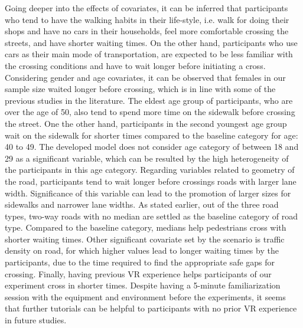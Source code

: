 Going deeper into the effects of covariates, it can be inferred that participants who tend to have the walking habits in their life-style, i.e. walk for doing their shops and have no cars in their households, feel more comfortable crossing the streets, and have shorter waiting times. On the other hand, participants who use cars as their main mode of transportation, are expected to be less familiar with the crossing conditions and have to wait longer before initiating a cross. Considering gender and age covariates, it can be observed that females in our sample size waited longer before crossing, which is in line with some of the previous studies in the literature. The eldest age group of participants, who are over the age of 50, also tend to spend more time on the sidewalk before crossing the street. One the other hand, participants in the second youngest age group wait on the sidewalk for shorter times compared to the baseline category for age: 40 to 49. The developed model does not consider age category of between 18 and 29 as a significant variable, which can be resulted by the high heterogeneity of the participants in this age category.
Regarding variables related to geometry of the road, participants tend to wait longer before crossings roads with larger lane width. Significance of this variable can lead to the promotion of larger sizes for sidewalks and narrower lane widths. As stated earlier, out of the three road types, two-way roads with no median are settled as the baseline category of road type. Compared to the baseline category, medians help pedestrians cross with shorter waiting times.
Other significant covariate set by the scenario is traffic density on road, for which higher values lead to longer waiting times by the participants, due to the time required to find the appropriate safe gaps for crossing.
Finally, having previous VR experience helps participants of our experiment cross in shorter times. Despite having a 5-minute familiarization session with the equipment and environment before the experiments, it seems that further tutorials can be helpful to participants with no prior VR experience in future studies.

